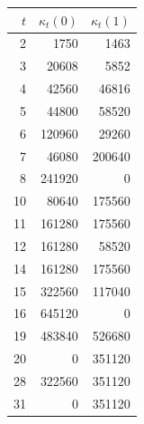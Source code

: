 \begin{center}\begin{tabular}{rrr}\toprule
$t$&$\kappa_t(0)$&$\kappa_t(1)$\\\midrule
2&1750&1463\\
3&20608&5852\\
4&42560&46816\\
5&44800&58520\\
6&120960&29260\\
7&46080&200640\\
8&241920&0\\
10&80640&175560\\
11&161280&175560\\
12&161280&58520\\
14&161280&175560\\
15&322560&117040\\
16&645120&0\\
19&483840&526680\\
20&0&351120\\
28&322560&351120\\
31&0&351120\\
\bottomrule\end{tabular}\end{center}
